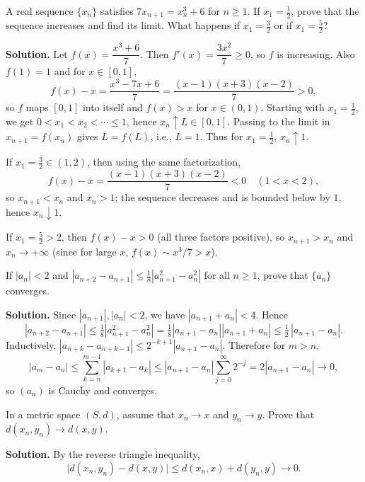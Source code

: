 \begin{problembox}
A real sequence $\{x_n\}$ satisfies $7x_{n+1} = x_n^3 + 6$ for $n \geq 1$. If $x_1 = \frac{1}{2}$, prove that the sequence increases and find its limit. What happens if $x_1 = \frac{3}{2}$ or if $x_1 = \frac{5}{2}$?
\end{problembox}

\noindent\textbf{Solution.}
Let $f(x)=\dfrac{x^3+6}{7}$. Then $f'(x)=\dfrac{3x^2}{7}\ge 0$, so $f$ is increasing. Also $f(1)=1$ and for $x\in[0,1]$,
\[
f(x)-x=\frac{x^3-7x+6}{7}=\frac{(x-1)(x+3)(x-2)}{7}>0,
\]
so $f$ maps $[0,1]$ into itself and $f(x)>x$ for $x\in(0,1)$. Starting with $x_1=\tfrac12$, we get $0<x_1<x_2<\cdots\le 1$, hence $x_n\uparrow L\in[0,1]$. Passing to the limit in $x_{n+1}=f(x_n)$ gives $L=f(L)$, i.e., $L=1$. Thus for $x_1=\tfrac12$, $x_n\uparrow 1$.

If $x_1=\tfrac32\in(1,2)$, then using the same factorization,
\[
f(x)-x=\frac{(x-1)(x+3)(x-2)}{7}<0\quad(1<x<2),
\]
so $x_{n+1}<x_n$ and $x_n>1$; the sequence decreases and is bounded below by $1$, hence $x_n\downarrow 1$.

If $x_1=\tfrac52>2$, then $f(x)-x>0$ (all three factors positive), so $x_{n+1}>x_n$ and $x_n\to+\infty$ (since for large $x$, $f(x)\sim x^3/7>x$).
\medskip

\begin{problembox}
If $|a_n| < 2$ and $|a_{n+2} - a_{n+1}| \leq \frac{1}{8} |a_{n+1}^2 - a_n^2|$ for all $n \geq 1$, prove that $\{a_n\}$ converges.
\end{problembox}

\noindent\textbf{Solution.}
Since $|a_{n+1}|,|a_n|<2$, we have $|a_{n+1}+a_n|<4$. Hence
\[
|a_{n+2}-a_{n+1}|\le\tfrac18|a_{n+1}^2-a_n^2|=\tfrac18|a_{n+1}-a_n||a_{n+1}+a_n|
\le \tfrac12\,|a_{n+1}-a_n|.
\]
Inductively, $|a_{n+k}-a_{n+k-1}|\le 2^{-k+1}|a_{n+1}-a_n|$. Therefore for $m>n$,
\[
|a_m-a_n|\le \sum_{k=n}^{m-1}|a_{k+1}-a_k|\le |a_{n+1}-a_n|\sum_{j=0}^{\infty}2^{-j}=2|a_{n+1}-a_n|\to 0,
\]
so $(a_n)$ is Cauchy and converges.
\medskip

\begin{problembox}
In a metric space $(S, d)$, assume that $x_n \to x$ and $y_n \to y$. Prove that $d(x_n, y_n) \to d(x, y)$.
\end{problembox}

\noindent\textbf{Solution.}
By the reverse triangle inequality,
\[
\big|d(x_n,y_n)-d(x,y)\big|\le d(x_n,x)+d(y_n,y)\to 0.
\]
\medskip

